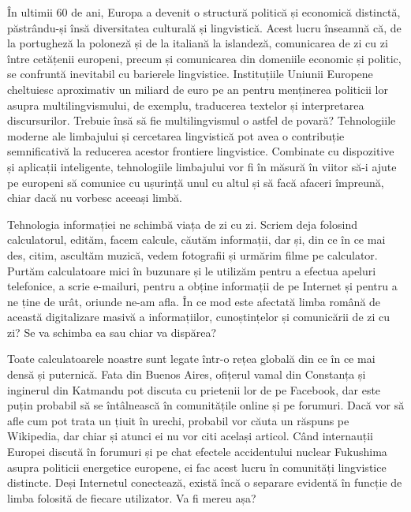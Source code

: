 \begin{multicols}{2}

În ultimii 60 de ani, Europa a devenit o structură politică și economică distinctă, păstrându-și însă diversitatea culturală și lingvistică. Acest lucru înseamnă că, de la portugheză la poloneză și de la italiană la islandeză, comunicarea de zi cu zi între cetățenii europeni, precum și comunicarea din domeniile economic și politic, se confruntă inevitabil cu barierele lingvistice. Instituțiile Uniunii Europene cheltuiesc aproximativ un miliard de euro pe an pentru menținerea politicii lor asupra multilingvismului, de exemplu, traducerea textelor și interpretarea discursurilor. Trebuie însă să fie multilingvismul o astfel de povară? Tehnologiile moderne ale limbajului și cercetarea lingvistică pot avea o contribuție semnificativă la reducerea acestor frontiere lingvistice. Combinate cu dispozitive și aplicații inteligente, tehnologiile limbajului vor fi în măsură în viitor să-i ajute pe europeni să comunice cu ușurință unul cu altul și să facă afaceri împreună, chiar dacă nu vorbesc aceeași limbă.


Tehnologia informației ne schimbă viața de zi cu zi. Scriem deja folosind calculatorul, edităm, facem calcule, căutăm informații, dar și, din ce în ce mai des, citim, ascultăm muzică, vedem fotografii și urmărim filme pe calculator. Purtăm calculatoare mici în buzunare și le utilizăm pentru a efectua apeluri telefonice, a scrie \mbox{e-mailuri}, pentru a obține informații de pe Internet și pentru a ne ține de urât, oriunde ne-am afla. În ce mod este afectată limba română de această digitalizare masivă a informațiilor, cunoștințelor și comunicării de zi cu zi? Se va schimba ea sau chiar va dispărea?

Toate calculatoarele noastre sunt legate \mbox{într-o} rețea globală din ce în ce mai densă și puternică. Fata din Buenos Aires, ofițerul vamal din Constanța și inginerul din Katmandu pot discuta cu prietenii lor de pe Facebook, dar este puțin probabil să se întâlnească în comunitățile online și pe forumuri. Dacă vor să afle cum pot trata un țiuit în urechi, probabil vor căuta un răspuns pe Wikipedia, dar chiar și atunci ei nu vor citi același articol. Când internauții Europei discută în forumuri și pe chat efectele accidentului nuclear Fukushima asupra politicii energetice europene, ei fac acest lucru în comunități lingvistice distincte. Deși Internetul conectează, există încă o separare evidentă în funcție de limba folosită de fiecare utilizator. Va fi mereu așa?


\end{multicols}
